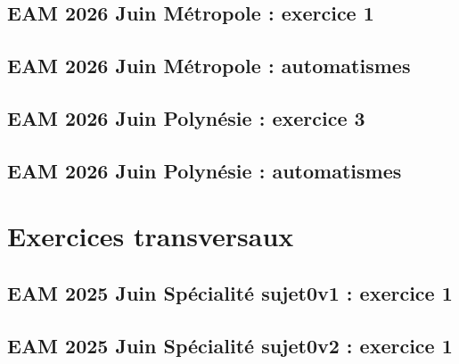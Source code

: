 \documentclass[lang=fr,edition=teacher,layout=sheet]{mxbook}
\begin{document}
\par\bigskip
{}\subsection*{EAM 2026 Juin Métropole : exercice 1}
\begingroup\endgroup
\par\bigskip
{}\subsection*{EAM 2026 Juin Métropole : automatismes}
\begingroup\endgroup
\par\bigskip
{}\subsection*{EAM 2026 Juin Polynésie : exercice 3}
\begingroup\endgroup
\par\bigskip
{}\subsection*{EAM 2026 Juin Polynésie : automatismes}
\begingroup\endgroup
\par\bigskip
\clearpage\section*{Exercices transversaux}
\subsection*{EAM 2025 Juin Spécialité sujet0v1 : exercice 1}
\begingroup\endgroup
\par\bigskip
{}\subsection*{EAM 2025 Juin Spécialité sujet0v2 : exercice 1}
\end{document}
